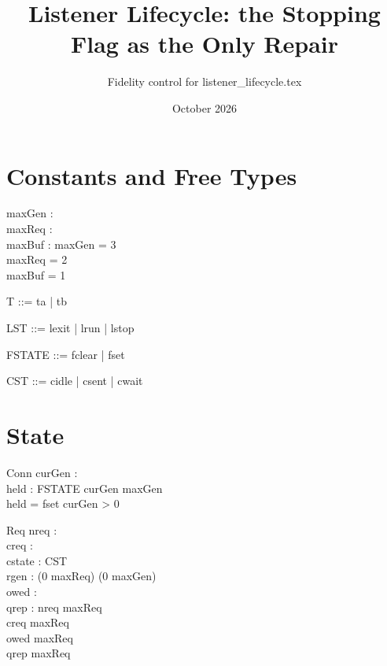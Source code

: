 \documentclass[a4paper,10pt,fleqn]{article}
\begin{document}
\title{Listener Lifecycle: the Stopping Flag as the Only Repair}
\author{Fidelity control for listener\_lifecycle.tex}
\date{October 2026}
\maketitle

\section{Constants and Free Types}

\begin{axdef}
  maxGen : \nat \\
  maxReq : \nat \\
  maxBuf : \nat
\where
  maxGen = 3 \\
  maxReq = 2 \\
  maxBuf = 1
\end{axdef}

\begin{zed}
  T ::= ta | tb
\end{zed}

\begin{zed}
  LST ::= lexit | lrun | lstop
\end{zed}

\begin{zed}
  FSTATE ::= fclear | fset
\end{zed}

\begin{zed}
  CST ::= cidle | csent | cwait
\end{zed}

\section{State}

\begin{schema}{Conn}
  curGen : \nat \\
  held : FSTATE
\where
  curGen \leq maxGen \\
  held = fset \implies curGen > 0
\end{schema}

\begin{schema}{Req}
  nreq : \nat \\
  creq : \nat \\
  cstate : CST \\
  rgen : (0 \upto maxReq) \fun (0 \upto maxGen) \\
  owed : \power \nat \\
  qrep : \power \nat
\where
  nreq \leq maxReq \\
  creq \leq maxReq \\
  owed  \upto maxReq \\
  qrep  \upto maxReq
\end{schema}
\end{document}
